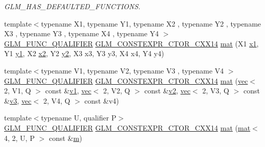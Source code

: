 \begin{DoxyCompactItemize}
\begin{DoxyCompactList}\small\item\em G\+L\+M\+\_\+\+H\+A\+S\+\_\+\+D\+E\+F\+A\+U\+L\+T\+E\+D\+\_\+\+F\+U\+N\+C\+T\+I\+O\+NS. \end{DoxyCompactList}\item 
{\footnotesize template$<$typename X1, typename Y1, typename X2 , typename Y2 , typename X3 , typename Y3 , typename X4 , typename Y4 $>$ }\\\mbox{\hyperlink{setup_8hpp_a33fdea6f91c5f834105f7415e2a64407}{G\+L\+M\+\_\+\+F\+U\+N\+C\+\_\+\+Q\+U\+A\+L\+I\+F\+I\+ER}} \mbox{\hyperlink{setup_8hpp_a0900f9145e68bf6061b6f5e7be3fa751}{G\+L\+M\+\_\+\+C\+O\+N\+S\+T\+E\+X\+P\+R\+\_\+\+C\+T\+O\+R\+\_\+\+C\+X\+X14}} \mbox{\hyperlink{structglm_1_1mat_3_014_00_012_00_01_t_00_01_q_01_4_abafe54829e43297a21e26ae004aa8db0}{mat}} (X1 \mbox{\hyperlink{_s_d_l__opengl__glext_8h_a49825216c96caaeb09237b36651181c5}{x1}}, Y1 \mbox{\hyperlink{_s_d_l__opengl__glext_8h_a3af6c78fcdfccea028a5878bc747ef39}{y1}}, X2 \mbox{\hyperlink{_s_d_l__opengl__glext_8h_a7b907a03236685c534d89d604cff23c8}{x2}}, Y2 \mbox{\hyperlink{_s_d_l__opengl__glext_8h_a2be1135ed68e8d80fa9e130c7814f8c2}{y2}}, X3 x3, Y3 y3, X4 x4, Y4 y4)
\item 
{\footnotesize template$<$typename V1, typename V2, typename V3 , typename V4 $>$ }\\\mbox{\hyperlink{setup_8hpp_a33fdea6f91c5f834105f7415e2a64407}{G\+L\+M\+\_\+\+F\+U\+N\+C\+\_\+\+Q\+U\+A\+L\+I\+F\+I\+ER}} \mbox{\hyperlink{setup_8hpp_a0900f9145e68bf6061b6f5e7be3fa751}{G\+L\+M\+\_\+\+C\+O\+N\+S\+T\+E\+X\+P\+R\+\_\+\+C\+T\+O\+R\+\_\+\+C\+X\+X14}} \mbox{\hyperlink{structglm_1_1mat_3_014_00_012_00_01_t_00_01_q_01_4_ae4f422e3a1f8e3fa42d2782ec06a8200}{mat}} (\mbox{\hyperlink{structglm_1_1vec}{vec}}$<$ 2, V1, Q $>$ const \&\mbox{\hyperlink{_s_d_l__opengl__glext_8h_a435c176a02c061b43e19bdf7c86cceae}{v1}}, \mbox{\hyperlink{structglm_1_1vec}{vec}}$<$ 2, V2, Q $>$ const \&\mbox{\hyperlink{_s_d_l__opengl__glext_8h_a0928f6d0f0f794ba000a21dfae422136}{v2}}, \mbox{\hyperlink{structglm_1_1vec}{vec}}$<$ 2, V3, Q $>$ const \&\mbox{\hyperlink{_s_d_l__opengl__glext_8h_acc806b31cbf466ceba6555983d8b814d}{v3}}, \mbox{\hyperlink{structglm_1_1vec}{vec}}$<$ 2, V4, Q $>$ const \&v4)
\item 
{\footnotesize template$<$typename U, qualifier P$>$ }\\\mbox{\hyperlink{setup_8hpp_a33fdea6f91c5f834105f7415e2a64407}{G\+L\+M\+\_\+\+F\+U\+N\+C\+\_\+\+Q\+U\+A\+L\+I\+F\+I\+ER}} \mbox{\hyperlink{setup_8hpp_a0900f9145e68bf6061b6f5e7be3fa751}{G\+L\+M\+\_\+\+C\+O\+N\+S\+T\+E\+X\+P\+R\+\_\+\+C\+T\+O\+R\+\_\+\+C\+X\+X14}} \mbox{\hyperlink{structglm_1_1mat_3_014_00_012_00_01_t_00_01_q_01_4_aee1461cf7e6bb89dcc9e2d387faef90b}{mat}} (\mbox{\hyperlink{structglm_1_1mat}{mat}}$<$ 4, 2, U, P $>$ const \&\mbox{\hyperlink{_s_d_l__opengl__glext_8h_af593500c283bf1a787a6f947f503a5c2}{m}})

\end{DoxyCompactItemize}
